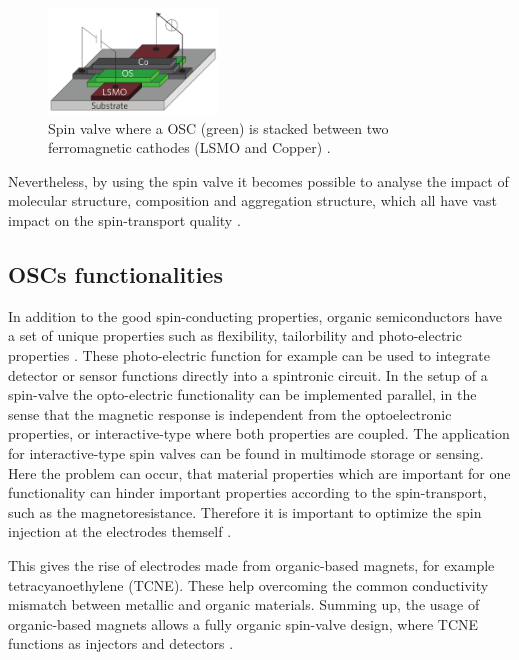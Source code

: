 \begin{figure}
    \centering
  \captionsetup{width=0.9\linewidth}
  \includegraphics[width=0.4\textwidth]{graphics/valve.png}
  \caption{Spin valve where a OSC (green) is stacked between two ferromagnetic cathodes (LSMO and Copper) \cite{routes}.}
  \label{fig:valve}
\end{figure}

Nevertheless, by using the spin valve it becomes possible to analyse the impact of molecular structure, composition and aggregation structure, which all have vast impact on the spin-transport quality \cite{appl-organic}.

\subsection{OSCs functionalities}

In addition to the good spin-conducting properties, organic semiconductors have a set of unique properties such as flexibility, tailorbility and photo-electric properties \cite{appl-organic}.
These photo-electric function for example can be used to integrate detector or sensor functions directly into a spintronic circuit.
In the setup of a spin-valve the opto-electric functionality can be implemented parallel, in the sense that the magnetic response is independent from the optoelectronic properties, or interactive-type where both properties are coupled.
The application for interactive-type spin valves can be found in multimode storage or sensing.
Here the problem can occur, that material properties which are important for one functionality can hinder important properties according to the spin-transport, such as the magnetoresistance.
Therefore it is important to optimize the spin injection at the electrodes themself \cite{perovskite}.

This gives the rise of electrodes made from organic-based magnets, for example tetracyanoethylene (TCNE).
These help overcoming the common conductivity mismatch between metallic and organic materials.
Summing up, the usage of organic-based magnets allows a fully organic spin-valve design, where TCNE functions as injectors and detectors \cite{perovskite}.

